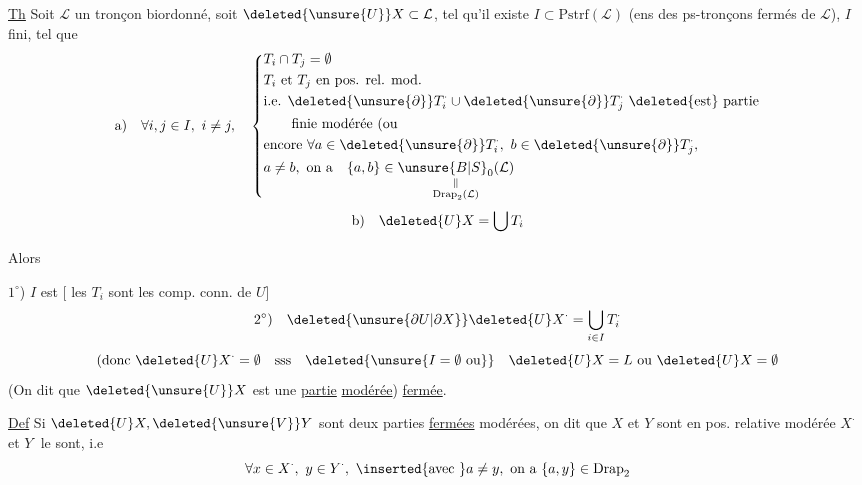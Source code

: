 \uline{Th} Soit $\mathcal L$ un tronçon biordonné, soit $\deleted{\unsure{U}}X\subset\mathcal L$, tel qu'il existe $I\subset\mathrm{Pstrf}(\mathcal L)$ (ens des ps-tronçons fermés de $\mathcal L$), $I$ fini,  tel que
\[
\begin{aligned}
\text{a)}\quad \forall i,j\in I,\ i\ne j,\quad
\left\{\begin{aligned}
&T_i\cap T_j=\emptyset\\
&T_i\text{ et }T_j\text{ en pos. rel. mod.}\\
&\text{i.e. }\deleted{\unsure{\partial}}T_i^{\cdot}\cup \deleted{\unsure{\partial}}T_j^{\cdot}\ \text{\deleted{est} partie}\\
&\qquad\text{finie modérée (ou}\\
&\text{encore }\forall a\in\deleted{\unsure{\partial}}T_i^{\cdot},\ b\in\deleted{\unsure{\partial}}T_j^{\cdot},\\
&a\ne b,\ \text{on a}\quad\{a,b\}\in\underset{\substack{\Vert\\\mathrm{Drap}_2(\mathcal L)}}{\unsure{B|S}_{0}(\mathcal L)}
\end{aligned}\right.
\end{aligned}
\]
\[
\text{b)}\quad \deleted{U}X=\bigcup T_i
\]

Alors

$1^\circ$) $I$ est  [ les $T_i$ sont les comp. conn. de $U$]
\[
\text{$2^\circ$)}\quad \deleted{\unsure{\partial U|\partial X}}\deleted{U}X^{\cdot}=\bigcup_{i\in I}T_i^{\cdot}
\]
\[
(\text{donc }\deleted{U}X^{\cdot}=\emptyset\quad\text{sss}\quad\deleted{\unsure{I=\emptyset\ \text{ou}}}\quad\deleted{U}X=L\text{ ou }\deleted{U}X=\emptyset
\]
(On dit que $\deleted{\unsure{U}}X$ est une \uline{partie} \uline{modérée}) \uline{fermée}.

\uline{Def} Si $\deleted{U}X,\deleted{\unsure{V}}Y$ sont deux parties \uline{fermées} modérées, on dit que $X$ et $Y$ sont en pos. relative modérée $X^{\cdot}$ et $Y^{\cdot}$ le sont, i.e
\[
\forall x\in X^{\cdot},\ y\in Y^{\cdot},\ \inserted{\text{avec }}a\ne y,\ \text{on a }\{a,y\}\in\mathrm{Drap}_2
\]

